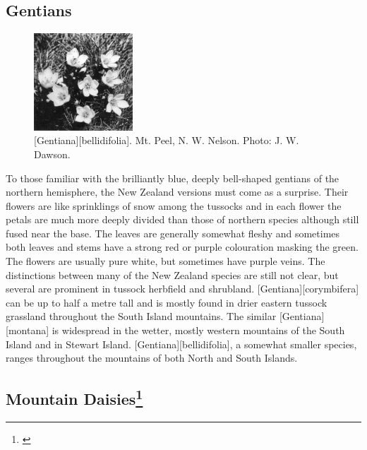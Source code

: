 \subsection{Gentians}

\begin{figure}
	\includegraphics[width=0.33\textwidth]{graphics/figure101gentiana.jpg}
	\centering
	\caption[\emph{Gentiana bellidifolia}]{[Gentiana][bellidifolia].
	Mt. Peel,  N. W. Nelson.
	Photo: J. W. Dawson.}%
	\label{fig:101gentiana}
\end{figure}

To those familiar with the brilliantly blue, deeply bell-shaped gentians of the northern hemisphere, the New Zealand versions must come as a surprise.
Their flowers are like sprinklings of snow among the tussocks and in each flower the petals are much more deeply divided than those of northern species although still fused near the base.
The leaves are generally somewhat fleshy and sometimes both leaves and stems have a strong red or purple colouration masking the green.
The flowers are usually pure white, but sometimes have purple veins.
The distinctions between many of the New Zealand species are still not clear, but several are prominent in tussock herbfield and shrubland. [Gentiana][corymbifera] can be up to half a metre tall and is mostly found in drier eastern tussock grassland throughout the South Island mountains.
The similar [Gentiana][montana] is widespread in the wetter, mostly western mountains of the South Island and in Stewart Island. [Gentiana][bellidifolia], a somewhat smaller species, ranges throughout the mountains of both North and South Islands.

\subsection[Mountain Daisies]{Mountain Daisies\thinspace\footnote{\cite{given1969synopsis}}}

